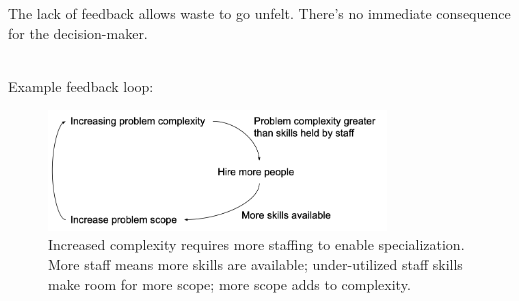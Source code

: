 The lack of feedback allows waste to go unfelt. There's no immediate consequence for the decision-maker.

\ \\

Example feedback loop:
\begin{center}
\begin{figure}[ht]
    \centering
    \includegraphics[width=0.8\textwidth]{images/feedback_loop_complexity_and_staffing}
    \caption{Increased complexity requires more staffing to enable specialization. More staff means more skills are available; under-utilized staff skills make room for more scope; more scope adds to complexity.}
    \label{fig:complexity_and_staff_growth}
\end{figure}
\end{center}


